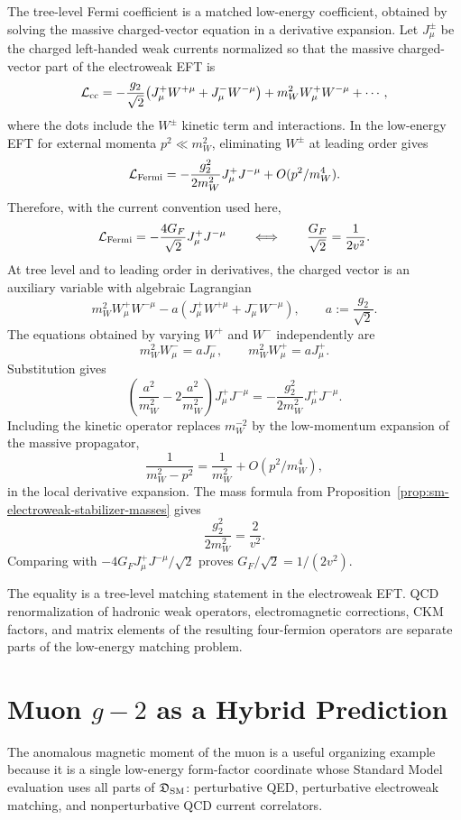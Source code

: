 The tree-level Fermi coefficient is a matched low-energy coefficient, obtained
by solving the massive charged-vector equation in a derivative expansion.  Let
\(J^\pm_\mu\) be the charged left-handed weak currents normalized so that
the massive charged-vector part of the electroweak EFT is
\[
  \mathcal L_{\rm cc}
  =
  -\frac{g_2}{\sqrt2}\bigl(J^+_\mu W^{+\mu}+J^-_\mu W^{-\mu}\bigr)
  +m_W^2 W^+_\mu W^{-\mu}
  +\cdots ,
\]
where the dots include the \(W^\pm\) kinetic term and interactions.  In the
low-energy EFT for external momenta \(p^2\ll m_W^2\), eliminating \(W^\pm\) at
leading order gives
\[
  \mathcal L_{\rm Fermi}
  =
  -\frac{g_2^2}{2m_W^2}J^+_\mu J^{-\mu}
  +O(p^2/m_W^4).
\]
Therefore, with the current convention used here,
\[
  \mathcal L_{\rm Fermi}
  =
  -\frac{4G_F}{\sqrt2}J^+_\mu J^{-\mu}
  \qquad\Longleftrightarrow\qquad
  \frac{G_F}{\sqrt2}=\frac{1}{2v^2}.
\]
At tree level and to leading order in derivatives, the charged vector is an
auxiliary variable with algebraic Lagrangian
\[
  m_W^2 W^+_\mu W^{-\mu}
  -a(J^+_\mu W^{+\mu}+J^-_\mu W^{-\mu}),
  \qquad a:=\frac{g_2}{\sqrt2}.
\]
The equations obtained by varying \(W^+\) and \(W^-\) independently are
\[
  m_W^2W^-_\mu=aJ^-_\mu,\qquad
  m_W^2W^+_\mu=aJ^+_\mu .
\]
Substitution gives
\[
  \left(\frac{a^2}{m_W^2}
  -2\frac{a^2}{m_W^2}\right)J^+_\mu J^{-\mu}
  =
  -\frac{g_2^2}{2m_W^2}J^+_\mu J^{-\mu}.
\]
Including the kinetic operator replaces \(m_W^{-2}\) by the low-momentum
expansion of the massive propagator,
\[
  \frac1{m_W^2-p^2}
  =
  \frac1{m_W^2}+O(p^2/m_W^4),
\]
in the local derivative expansion.  The mass formula from
Proposition~\ref{prop:sm-electroweak-stabilizer-masses} gives
\[
  \frac{g_2^2}{2m_W^2}=\frac{2}{v^2}.
\]
Comparing with
\(-4G_FJ^+_\mu J^{-\mu}/\sqrt2\) proves
\(G_F/\sqrt2=1/(2v^2)\).

The equality is a tree-level matching statement in the electroweak EFT.  QCD
renormalization of hadronic weak operators, electromagnetic corrections, CKM
factors, and matrix elements of the resulting four-fermion operators are
separate parts of the low-energy matching problem.

\section{Muon \texorpdfstring{\(g-2\)}{g-2} as a Hybrid Prediction}

The anomalous magnetic moment of the muon is a useful organizing example
because it is a single low-energy form-factor coordinate whose Standard Model
evaluation uses all parts of
\(\mathfrak D_{\rm SM}\): perturbative QED, perturbative electroweak matching,
and nonperturbative QCD current correlators.

